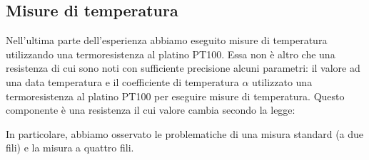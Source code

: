 \subsection{Misure di temperatura}

Nell'ultima parte dell'esperienza abbiamo eseguito misure di temperatura utilizzando una termoresistenza al platino PT100.
Essa non è altro che una resistenza di cui sono noti con sufficiente precisione alcuni parametri: il valore ad una data temperatura e il coefficiente di temperatura $\alpha$
 utilizzato una termoresistenza al platino PT100 per eseguire misure di temperatura.
Questo componente è una resistenza il cui valore cambia secondo la legge:





In particolare, abbiamo osservato le problematiche di una misura standard (a due fili) e la misura a quattro fili.
